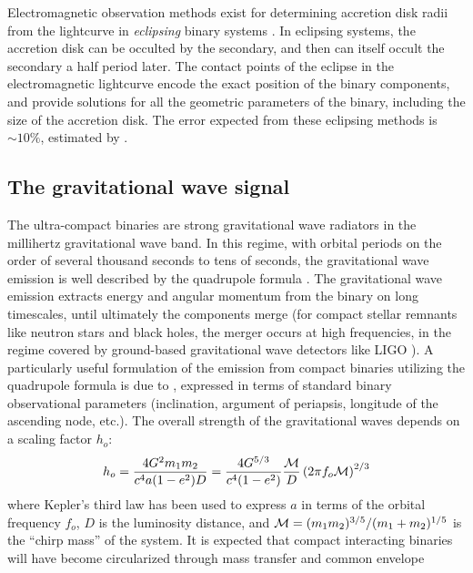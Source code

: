 \documentclass[preprint2]{aastex}
\begin{document}
Electromagnetic observation methods exist for determining accretion
disk radii from the lightcurve in \textit{eclipsing} binary systems
\citep{Ritter1980,Sulkanen81}.  In eclipsing systems, the accretion
disk can be occulted by the secondary, and then can itself occult the
secondary a half period later.  The contact points of the eclipse in
the electromagnetic lightcurve encode the exact position of the
binary components, and provide solutions for all the geometric
parameters of the binary, including the size of the accretion disk.
The error expected from these eclipsing methods is $\sim 10\%$,
estimated by \citet{1981ApJ...244..579S}.

\subsection{The gravitational wave signal}\label{sub.gwSignals}
The ultra-compact binaries are strong gravitational wave radiators in
the millihertz gravitational wave band.  In this regime, with orbital
periods on the order of several thousand seconds to tens of seconds,
the gravitational wave emission is well described by the quadrupole
formula \citep{PM,PM63}.  The gravitational wave emission extracts
energy and angular momentum from the binary on long timescales, until
ultimately the components merge (for compact stellar remnants like
neutron stars and black holes, the merger occurs at high frequencies,
in the regime covered by ground-based gravitational wave detectors
like LIGO \citep{ligoStatus2010}).  A particularly useful formulation
of the emission from compact binaries utilizing the quadrupole
formula is due to \citep{WahlquistBinary}, expressed in terms of
standard binary observational parameters (inclination, argument of
periapsis, longitude of the ascending node, etc.).  The overall
strength of the gravitational waves depends on a scaling factor
$h_{o}$:
\begin{equation}
	h_{o} = \frac{4G^{2}m_{1}m_{2}}{c^{4}a(1 - e^{2})D} =
	\frac{4G^{5/3}}{c^{4}(1-e^{2})}\frac{{\cal M}}{D}\left(2
	\pi f_{o} {\cal M}\right)^{2/3}
    \label{eqn.scalingAmplitude}
\end{equation}
where Kepler's third law has been used to express $a$ in terms of the
orbital frequency $f_{o}$, $D$ is the luminosity distance, and ${\cal
M} = (m_{1}m_{2})^{3/5}/(m_{1} + m_{2})^{1/5}$ is the ``chirp mass''
of the system.  It is expected that compact interacting binaries will
have become circularized through mass transfer and common envelope
\end{document}
